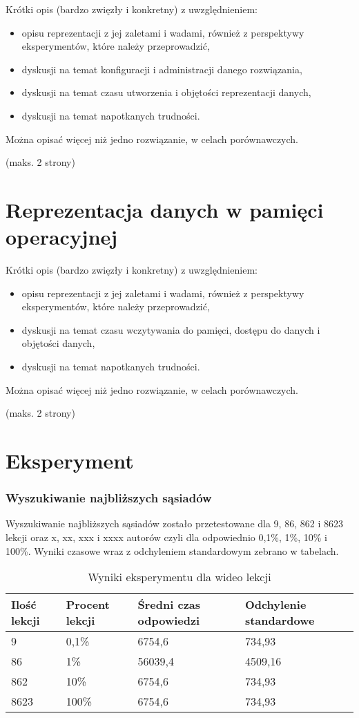 \documentclass[a4paper,11pt]{article}
\begin{document}
Krótki opis (bardzo zwięzły i konkretny) z uwzględnieniem:
\begin{itemize}
\item opisu reprezentacji z jej zaletami i wadami, również z perspektywy eksperymentów, które należy przeprowadzić,
\item dyskusji na temat konfiguracji i administracji danego rozwiązania,
\item dyskusji na temat czasu utworzenia i objętości reprezentacji danych,
\item dyskusji na temat napotkanych trudności.
\end{itemize}

Można opisać więcej niż jedno rozwiązanie, w celach porównawczych.

(maks. 2 strony)


\section{Reprezentacja danych w pamięci operacyjnej}

Krótki opis (bardzo zwięzły i konkretny) z uwzględnieniem:
\begin{itemize}
\item opisu reprezentacji z jej zaletami i wadami, również z perspektywy eksperymentów, które należy przeprowadzić,
\item dyskusji na temat czasu wczytywania do pamięci, dostępu do danych i objętości danych,
\item dyskusji na temat napotkanych trudności.
\end{itemize}

Można opisać więcej niż jedno rozwiązanie, w celach porównawczych.

(maks. 2 strony)

\section{Eksperyment}

\subsubsection{Wyszukiwanie najbliższych sąsiadów}
Wyszukiwanie najbliższych sąsiadów zostało przetestowane dla 9, 86, 862 i 8623 lekcji oraz x, xx, xxx i xxxx autorów czyli dla odpowiednio 0,1\%, 1\%, 10\% i 100\%. Wyniki czasowe wraz z odchyleniem standardowym zebrano w tabelach.
\begin{table}
\begin{center}
\begin{tabular}{llll}
Ilość lekcji & Procent lekcji & Średni czas odpowiedzi & Odchylenie standardowe \\ 
\hline
9 & 0,1\% & 6754,6 & 734,93 \\
86 & 1\% & 56039,4 & 4509,16 \\
862 & 10\% & 6754,6 & 734,93 \\
8623 & 100\% & 6754,6 & 734,93 \\
\hline
\end{tabular}
\end{center}
\caption{Wyniki eksperymentu dla wideo lekcji}
\end{table}
\end{document}

